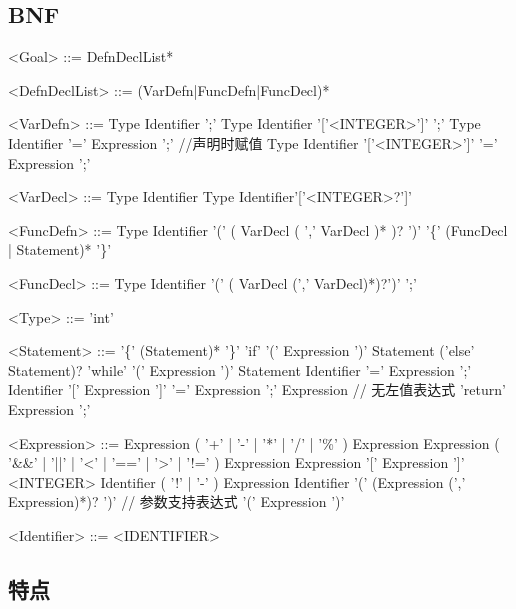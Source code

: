 \documentclass{ctexart}
\newenvironment{typewriterfont}{\ttfamily}{\par}
\begin{document}
\subsection{BNF}
\setlength{\grammarindent}{8em} %
\begin{typewriterfont}
\begin{grammar}
<Goal> ::= DefnDeclList*

<DefnDeclList> ::= (VarDefn|FuncDefn|FuncDecl)*

<VarDefn> ::= Type Identifier ';'
\alt Type Identifier '['<INTEGER>']' ';'
\alt Type Identifier '=' Expression ';' //声明时赋值
\alt Type Identifier '['<INTEGER>']' '=' Expression ';'

<VarDecl> ::= Type Identifier
\alt Type Identifier'['<INTEGER>?']'

<FuncDefn>  ::= Type Identifier '(' ( VarDecl ( ',' VarDecl )* )? ')' '\{' (FuncDecl | Statement)* '\}'

<FuncDecl> ::= Type Identifier '(' ( VarDecl (',' VarDecl)*)?')' ';'


<Type> ::= 'int'

<Statement> ::= '\{' (Statement)* '\}'
\alt 'if' '(' Expression ')' Statement ('else' Statement)?
\alt 'while' '(' Expression ')' Statement
\alt Identifier '=' Expression ';'
\alt Identifier '[' Expression ']' '=' Expression ';'
\alt Expression // 无左值表达式
\alt 'return' Expression ';'

<Expression>	::=	Expression ( '+' | '-' | '*' | '/' | '\%' ) Expression
\alt Expression ( '\&\&' | '||' | '\textless' | '==' | '\textgreater' | '!=' ) Expression
\alt Expression '[' Expression ']'
\alt <INTEGER>
\alt Identifier
\alt ( '!' | '-' ) Expression
\alt Identifier '(' (Expression (',' Expression)*)? ')' // 参数支持表达式
\alt '(' Expression ')'

<Identifier>	::=	<IDENTIFIER>

\end{grammar}
\end{typewriterfont}

\subsection{特点}
\end{document}
